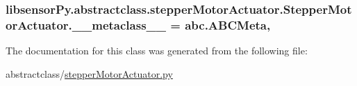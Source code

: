 \subsubsection[{\+\_\+\+\_\+metaclass\+\_\+\+\_\+}]{\setlength{\rightskip}{0pt plus 5cm}libsensor\+Py.\+abstractclass.\+stepper\+Motor\+Actuator.\+Stepper\+Motor\+Actuator.\+\_\+\+\_\+metaclass\+\_\+\+\_\+ = abc.\+A\+B\+C\+Meta\hspace{0.3cm}{\ttfamily [static]}, {\ttfamily [private]}}\label{classlibsensorPy_1_1abstractclass_1_1stepperMotorActuator_1_1StepperMotorActuator_acc74268bf305cbccc36471d56f4feff5}


The documentation for this class was generated from the following file\+:\begin{DoxyCompactItemize}
\item 
abstractclass/\hyperlink{stepperMotorActuator_8py}{stepper\+Motor\+Actuator.\+py}\end{DoxyCompactItemize}
